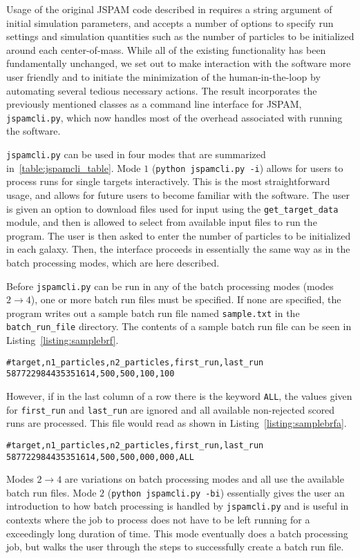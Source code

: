 Usage of the original JSPAM code described in \citet{Wallin2016}
requires a string argument of initial simulation parameters, and accepts a
number of options to specify run settings and simulation quantities such as
the number of particles to be initialized around each center-of-mass.
While all of the existing functionality has been fundamentally unchanged, we
set out to make interaction with the software more user friendly and to
initiate the minimization of the human-in-the-loop by automating several
tedious necessary actions. The result incorporates the previously mentioned
classes as a command line interface for JSPAM,
\texttt{jspamcli.py},
which now handles most of the overhead associated with running the software.

\texttt{jspamcli.py} can be used in four modes that are summarized
in~\ref{table:jspamcli_table}.
Mode $1$ (\texttt{python jspamcli.py -i}) allows for users to process runs for
single targets interactively. This is the most straightforward usage, and allows
for future users to become familiar with the software.
The user is given an option to download files used for input using
the \texttt{get\_target\_data} module, and then is allowed to select from
available input files to run the program.
The user is then asked to enter the number of particles to be initialized in
each galaxy. Then, the interface proceeds in
essentially the same way as in the batch processing modes, which are here
described.

Before \texttt{jspamcli.py} can be run in any of the batch processing modes
(modes $2\to4$), one or more batch run files must be specified. If none are
specified, the program writes out a sample batch run file named
\texttt{sample.txt} in the \texttt{batch\_run\_file} directory.
The contents of a sample batch run file can be seen in
Listing~\ref{listing:samplebrf}.
%
\begin{lstlisting}[caption={Sample batch run file}, label={listing:samplebrf}]
#target,n1_particles,n2_particles,first_run,last_run
587722984435351614,500,500,100,100
\end{lstlisting}
%
However, if in the last column of a row there is the keyword \texttt{ALL}, the
values given for \texttt{first\_run} and \texttt{last\_run} are ignored
and all available non-rejected scored runs are processed. This file would read
as shown in Listing~\ref{listing:samplebrfa}.
%
\begin{lstlisting}[caption={Batch run file for all runs}, label={listing:samplebrfa}]
#target,n1_particles,n2_particles,first_run,last_run
587722984435351614,500,500,000,000,ALL
\end{lstlisting}
%
Modes $2\to4$ are variations on batch processing modes and all use the
available batch run files.
Mode $2$ (\texttt{python jspamcli.py -bi}) essentially gives the user an
introduction to how batch processing is handled by \texttt{jspamcli.py} and is
useful in contexts where the job to process does not have to be left running
for a exceedingly long duration of time. This mode eventually does a batch
processing job, but walks the user through the steps to successfully create a
batch run file.

